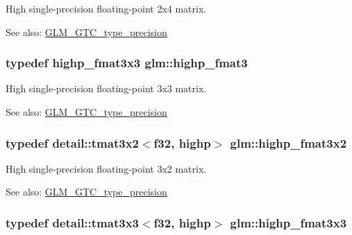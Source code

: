 High single-precision floating-point 2x4 matrix. \begin{Desc}
\item[See also:]\hyperlink{group__gtc__type__precision}{GLM\_\-GTC\_\-type\_\-precision} \end{Desc}
\hypertarget{group__gtc__type__precision_g3ff9af2eba26aa6df92aa73e1083e81e}{
\subsubsection[highp\_\-fmat3]{\setlength{\rightskip}{0pt plus 5cm}typedef highp\_\-fmat3x3 {\bf glm::highp\_\-fmat3}}}
\label{group__gtc__type__precision_g3ff9af2eba26aa6df92aa73e1083e81e}


High single-precision floating-point 3x3 matrix. \begin{Desc}
\item[See also:]\hyperlink{group__gtc__type__precision}{GLM\_\-GTC\_\-type\_\-precision} \end{Desc}
\hypertarget{group__gtc__type__precision_gd5c083691eb15539fd81e27e1dc6b813}{
\subsubsection[highp\_\-fmat3x2]{\setlength{\rightskip}{0pt plus 5cm}typedef detail::tmat3x2$<$f32, highp$>$ {\bf glm::highp\_\-fmat3x2}}}
\label{group__gtc__type__precision_gd5c083691eb15539fd81e27e1dc6b813}


High single-precision floating-point 3x2 matrix. \begin{Desc}
\item[See also:]\hyperlink{group__gtc__type__precision}{GLM\_\-GTC\_\-type\_\-precision} \end{Desc}
\hypertarget{group__gtc__type__precision_gf1d697243b1de74a5769c49e68b1e2a6}{
\subsubsection[highp\_\-fmat3x3]{\setlength{\rightskip}{0pt plus 5cm}typedef detail::tmat3x3$<$f32, highp$>$ {\bf glm::highp\_\-fmat3x3}}}
\label{group__gtc__type__precision_gf1d697243b1de74a5769c49e68b1e2a6}


